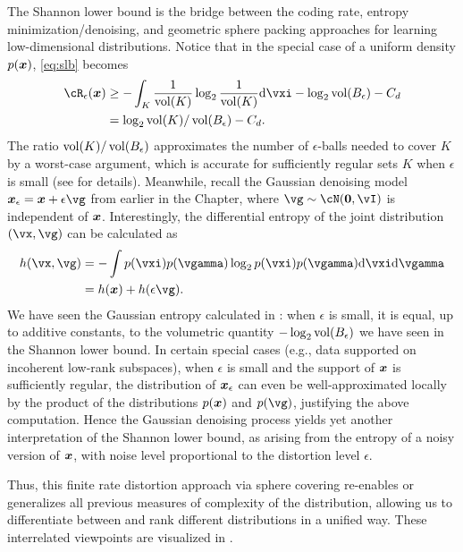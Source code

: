 \documentclass[../../book-main.tex]{subfiles}
\begin{document}
\begin{remark}
	The Shannon lower bound is the bridge between the coding rate, entropy
	minimization/denoising, and geometric sphere packing approaches for learning
	low-dimensional distributions. Notice that in the special case of a uniform
	density $p(\bm{x})$, \eqref{eq:slb} becomes
	\begin{align}
		\cR_{\epsilon}(\x) &\geq -\int_K \frac{1}{\volume(K)} \log_2
		\frac{1}{\volume(K)} \odif \vxi
		- \log_2 \volume(B_{\epsilon}) - C_d
		\\
		&=
		\log_2 \volume(K) / \volume(B_{\epsilon})
		- C_d. \label{eq:shannon-lower-bound-uniform}
	\end{align}
	The ratio $\operatorname{vol}(K) / \operatorname{vol}(B_{\epsilon})$ approximates the number of
	$\epsilon$-balls needed to cover $K$ by a worst-case argument, which is
	accurate for sufficiently regular sets $K$ when $\epsilon$ is small (see
	 for details).
	Meanwhile, recall the Gaussian denoising model $\x_{\epsilon} = \x
	+ \epsilon \vg$ from
	earlier in the Chapter, where $\vg \sim \cN(\Zero, \vI)$ is independent of
	$\bm{x}$.
	Interestingly, the differential entropy of the joint distribution $(\vx,
	\vg)$
	can be calculated as
	\begin{align}
		h(\vx, \vg)
		&=
		-\int
		p(\vxi) p(\vgamma) \log_2 p(\vxi) p(\vgamma) \odif \vxi \odif \vgamma
		\\
		&=
		h(\x) + h(\epsilon \vg).
	\end{align}
	We have seen the Gaussian entropy calculated in
	: when $\epsilon$ is small, it is equal, up
	to additive constants, to the volumetric quantity $-\log_2
	\operatorname{vol}(B_{\epsilon})$ we have seen in the Shannon lower bound.
	In certain special cases (e.g., data supported on incoherent low-rank subspaces),
	when $\epsilon$ is small and the support of $\bm{x}$ is sufficiently regular,
	the distribution of $\bm{x}_{\epsilon}$ can even be well-approximated locally by the
	product of the distributions $p(\bm{x})$ and $p(\vg)$, justifying the above
	computation. 
	Hence the Gaussian denoising process yields yet another interpretation of
	the Shannon lower bound, as arising from the entropy of a noisy version of
	$\bm{x}$, with noise level proportional to the distortion level $\epsilon$.


	Thus, this finite rate distortion approach via sphere covering re-enables or
	generalizes all previous measures of complexity of the distribution, allowing us
	to differentiate between and rank different distributions in a unified way.
	These interrelated viewpoints are visualized in .
\end{remark}
\end{document}
